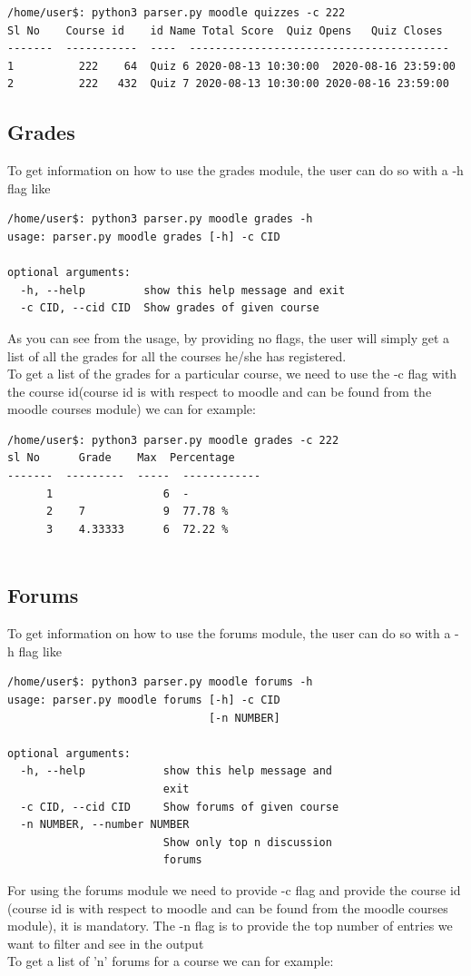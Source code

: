 \documentclass[12pt, letterpaper, twoside]{article}
\begin{document}
\begin{verbatim}
/home/user$: python3 parser.py moodle quizzes -c 222
Sl No    Course id    id Name Total Score  Quiz Opens   Quiz Closes
-------  -----------  ----  ----------------------------------------
1          222    64  Quiz 6 2020-08-13 10:30:00  2020-08-16 23:59:00
2          222   432  Quiz 7 2020-08-13 10:30:00 2020-08-16 23:59:00
\end{verbatim}

\subsection{Grades}
To get information on how to use the grades module, the user can do so with a -h flag like 
\begin{verbatim}
/home/user$: python3 parser.py moodle grades -h
usage: parser.py moodle grades [-h] -c CID

optional arguments:
  -h, --help         show this help message and exit
  -c CID, --cid CID  Show grades of given course
\end{verbatim}
As you can see from the usage, by providing no flags, the user will simply get a list of all the grades for all the courses he/she has registered.\\
To get a list of the grades for a particular course, we need to use the -c flag with the course id(course id is with respect to moodle and can be found from the moodle courses module) we can for example:

\begin{verbatim}
/home/user$: python3 parser.py moodle grades -c 222
sl No      Grade    Max  Percentage
-------  ---------  -----  ------------
      1                 6  -
      2    7            9  77.78 %
      3    4.33333      6  72.22 %
    
\end{verbatim}

\subsection{Forums}
To get information on how to use the forums module, the user can do so with a -h flag like 
\begin{verbatim}
/home/user$: python3 parser.py moodle forums -h
usage: parser.py moodle forums [-h] -c CID
                               [-n NUMBER]

optional arguments:
  -h, --help            show this help message and
                        exit
  -c CID, --cid CID     Show forums of given course
  -n NUMBER, --number NUMBER
                        Show only top n discussion
                        forums
\end{verbatim}
For using the forums module we need to provide -c flag and provide the course id (course id is with respect to moodle and can be found from the moodle courses module), it is mandatory. The -n flag is to provide the top number of entries we want to filter and see in the output\\
To get a list of 'n' forums for a course we can for example:
\end{document}

